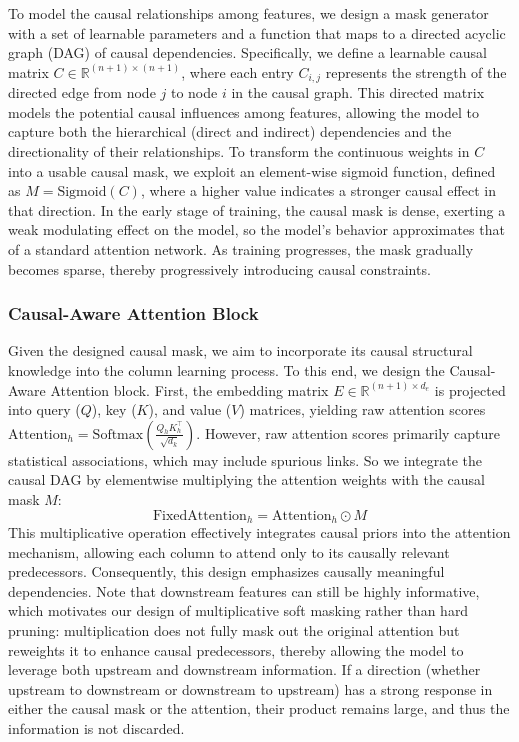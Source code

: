 \documentclass[sigconf, nonacm]{acmart}
\newcommand{\icde}[1]{{\color{black}#1}}
\newcommand{\done}[1]{{\color{black}#1}}
\newcommand{\rl}[1]{{\color{black}#1}}
\newcommand{\sydesi}[1]{{\color{black}#1}}
\newcommand{\syend}[1]{{\color{black}#1}}
\newcommand{\syadd}[1]{{\color{black}#1}}
\newcommand{\syfix}[1]{{\color{black}#1}}
\newcommand{\syne}[1]{{\color{black}#1}}
\newcommand{\vldb}[1]{{\color{red}#1}}
\begin{document}
\syadd{To model the causal relationships among \syfix{features}, we design a mask generator with a set of learnable parameters
and a function 
that \syne{maps} to a directed acyclic graph (DAG) %
of causal dependencies. 
Specifically, we define} \rl{a learnable causal matrix} $C \in \mathbb{R}^{(n+1) \times (n+1)}$, 
where each entry $C_{i,j}$ represents the strength of the directed edge from node $j$ to node $i$ in the causal graph.
\done{This directed matrix models the potential causal influences among \syfix{features}, allowing the model to capture both the hierarchical (direct and indirect) dependencies and the directionality of their relationships.
}
To transform the continuous weights in $C$ into a usable causal mask, \syend{we exploit an element-wise sigmoid function, defined as $M = \text{Sigmoid}(C)$, where a higher value indicates a stronger causal effect in that direction.}
\icde{
In the early stage of training, the causal mask is dense, exerting a weak modulating effect on the model, so the model's behavior approximates that of a standard attention network. 
As training progresses, the mask gradually becomes sparse, thereby progressively introducing causal constraints.
}

\subsubsection{\vldb{Causal-Aware} Attention Block
}\label{sec:causal_attn_block}

\sydesi{
Given the designed causal mask, we aim to incorporate its causal structural knowledge into the column learning process. 
To this end, we design the \vldb{Causal-Aware} Attention block.
\rl{First, the embedding matrix $E \in \mathbb{R}^{(n+1) \times d_e}$ is projected into query ($Q$), key ($K$), and value ($V$) matrices, yielding raw attention scores $\text{Attention}_{h} = \text{Softmax}(\frac{Q_h K_h^\top}{\sqrt{d_k}})$.}
}
\sydesi{However, raw attention scores primarily capture statistical associations, which may include spurious links. 
So we integrate the causal DAG by elementwise multiplying the attention weights with the causal mask $M$:}
\begin{equation}
    \text{FixedAttention}_h = \text{Attention}_h \odot M
    \label{eq:masked-attn}
\end{equation}
This multiplicative operation effectively integrates causal priors into the attention mechanism, \sydesi{allowing each column to attend only to its causally relevant predecessors. Consequently, this design emphasizes }causally meaningful dependencies.
\icde{
Note that downstream features can still be highly informative, which motivates our design of multiplicative soft masking rather than hard pruning: multiplication does not fully mask out the original attention but reweights it to enhance causal predecessors, thereby allowing the model to leverage both upstream and downstream information.
If a direction (whether upstream to downstream or downstream to upstream) has a strong response in either the causal mask or the attention, their product remains large, and thus the information is not discarded.
}
\end{document}
